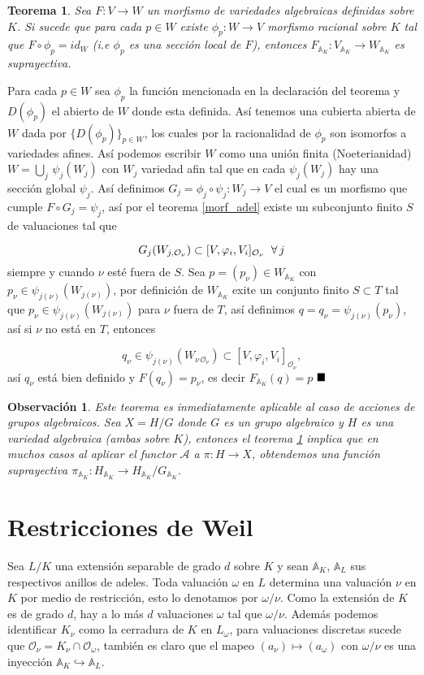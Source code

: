 \documentclass[letterpaper]{report}
\newtheorem{teorema}{Teorema}[chapter]
\newtheorem{obs}{Observaci\'on}
\newcommand{\dem}{{\sc Demostraci\'on. }}
\newcommand{\Oan}{\ensuremath{\mathcal{O}}}
\newcommand{\Ad}{\ensuremath{\mathbb{A}}}
\newcommand{\qed}{\ensuremath{\hspace*{0em plus 1fill}\blacksquare}}
\begin{document}
\begin{teorema}\label{supra}
Sea $F:V\rightarrow W$ un morfismo de variedades algebraicas definidas sobre $K$. Si sucede que para cada $p\in W$ existe $\phi_p:W\rightarrow V$ morfismo racional sobre $K$ tal que $F\circ\phi_p=id_W$ (i.e $\phi_p$ es una sección local de $F$), entonces \hbox{$F_{\Ad_{K}}:V_{\Ad_{K}}\rightarrow W_{\Ad_{K}}$} es suprayectiva. 
\end{teorema}   
\noindent\dem Para cada $p\in W$ sea $\phi_p$ la función mencionada en la declaración del teorema y $D(\phi_p)$ el abierto de $W$ donde esta definida. Así tenemos una cubierta abierta de $W$  dada por $\lbrace D(\phi_p)\rbrace_{p\in W}$, los cuales por la racionalidad de $\phi_p$ son isomorfos a variedades afines. Así podemos escribir $W$ como una unión finita (Noeterianidad) $W=\bigcup_j\,\psi_j(W_j)$ con $W_j$ variedad afin tal que en cada $\psi_j(W_j)$ hay una sección global $\psi_j$. Así definimos \hbox{$G_j=\phi_j\circ\psi_j:W_j\rightarrow V$} el cual es un morfismo que cumple $F\circ G_j=\psi_j$, así por el teorema \ref{morf_adel} existe un subconjunto finito $S$ de valuaciones tal que 

$$G_j(W_{j,\Oan_{\nu}})\subset[V,\varphi_i,V_i]_{\Oan_{\nu}}\hspace{0.2cm}\forall\,j$$
siempre y cuando $\nu$ esté fuera de $S$. Sea $p=(p_{\nu})\in W_{\Ad_{K}}$ con $p_{\nu}\in\psi_{j(\nu)}(W_{j(\nu)})$, por definición de $W_{\Ad_{K}}$ exite un conjunto finito $S\subset T$ tal que $p_{\nu}\in\psi_{j(\nu)}(W_{j(\nu)})$ para $\nu$ fuera de $T$, así definimos $q=q_{\nu}=\psi_{j(\nu)}(p_{\nu})$, así si $\nu$ no está en $T$, entonces 

$$q_{\nu}\in\psi_{j(\nu)}(W_{\nu\,\Oan_{\nu}})\subset[V,\varphi_i,V_i]_{\Oan_{\nu}},$$
\noindent así $q_{\nu}$ está bien definido y $F(q_{\nu})=p_{\nu}$, es decir $F_{\Ad_{K}}(q)=p$ \qed 
\begin{obs}
Este teorema es inmediatamente aplicable al caso de acciones de grupos algebraicos. Sea $X=H/G$ donde $G$ es un grupo algebraico y $H$ es una variedad algebraica (ambas sobre $K$), entonces el teorema \ref{supra} implica que en muchos casos al aplicar el functor $\mathcal{A}$ a $\pi:H\rightarrow X$, obtendemos una función suprayectiva $\pi_{\Ad_{K}}:H_{\Ad_{K}}\rightarrow H_{\Ad_{K}}/G_{\Ad_{K}}$. 
\end{obs}

\chapter{Restricciones de Weil}
\noindent Sea $L/K$ una extensión separable de grado $d$ sobre $K$ y sean $\Ad_{K}$, $\Ad_L$ sus respectivos anillos de adeles. Toda valuación $\omega$ en $L$ determina una valuación $\nu$ en $K$ por medio de restricción, esto lo denotamos por $\omega/\nu$. Como la extensión de $K$ es de grado $d$, hay a lo más $d$ valuaciones $\omega$ tal que $\omega/\nu$. Además podemos identificar $K_{\nu}$ como la cerradura de $K$ en $L_{\omega}$, para valuaciones discretas sucede que \hbox{$\Oan_{\nu}=K_{\nu}\cap\Oan_{\omega}$}, también es claro que el mapeo \hbox{$(a_{\nu})\mapsto(a_{\omega})$} con $\omega/\nu$ es una inyección $\Ad_K\hookrightarrow\Ad_L$. 
\end{document}
